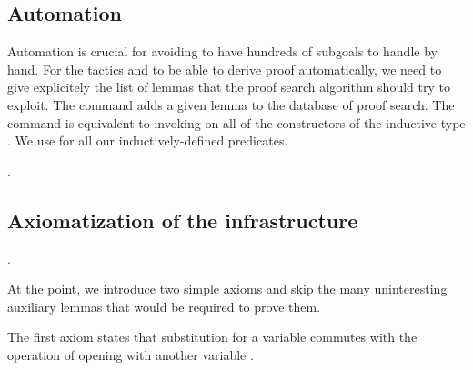 \documentclass[12pt]{report}
\begin{document}
\subsection{Automation}



 Automation is crucial for avoiding to have hundreds of subgoals to
    handle by hand. For the tactics  and  to be able to
    derive proof automatically, we need to give explicitely the list of
    lemmas that the proof search algorithm should try to exploit.
    The command    adds a given lemma to the database
    of proof search. The command    is equivalent
    to invoking   on all of the constructors of the inductive
    type . We use   for all our inductively-defined
    predicates.
\begin{coqdoccode}
\coqdocemptyline
\coqdocnoindent
{}   .\coqdoceol
\coqdocemptyline
\end{coqdoccode}
\subsection{Axiomatization of the infrastructure}

\begin{coqdoccode}
\coqdocemptyline
\coqdocnoindent
{} .\coqdoceol
\coqdocemptyline
\end{coqdoccode}
At the point, we introduce two simple axioms and skip the many
    uninteresting auxiliary lemmas that would be required to prove them.


    The first axiom states that substitution for a variable  
    commutes with the operation of opening with another variable .
\end{document}
